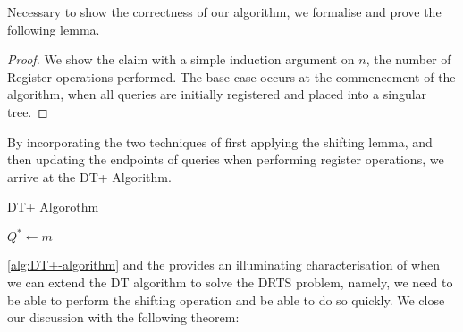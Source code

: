 \begin{algorithm}\label{alg:DT+-register}
\begin{algorithmic}[1]
\State {}
\EndProcedure
\end{algorithmic}
\end{algorithm}

Necessary to show the correctness of our algorithm, we formalise and prove the following lemma.

\begin{lemma}
    
\end{lemma}
\begin{proof}
    We show the claim with a simple induction argument on $n$, the number of Register operations performed. The base case occurs at the commencement of the algorithm, when all queries are initially registered and placed into a singular tree.
\end{proof}

By incorporating the two techniques of first applying the shifting lemma, and then updating the endpoints of queries when performing register operations, we arrive at the DT+ Algorithm. 

\begin{algorithm}
\caption{DT+ Algorothm}\label{alg:DT+-algorithm}
\begin{algorithmic}[1]
\Require $Q^* \gets m$ 
\State {}
    \State {}
    \State {}
\EndFor
\State {} 
    \State {}
    \State {}
    \State {}
    \State {}
    \EndFor
\EndFor
\end{algorithmic}
\end{algorithm}

\cref{alg:DT+-algorithm} and the provides an illuminating characterisation of when we can extend the DT algorithm to solve the DRTS problem, namely, we need to be able to perform the shifting operation and be able to do so quickly. We close our discussion with the following theorem:

